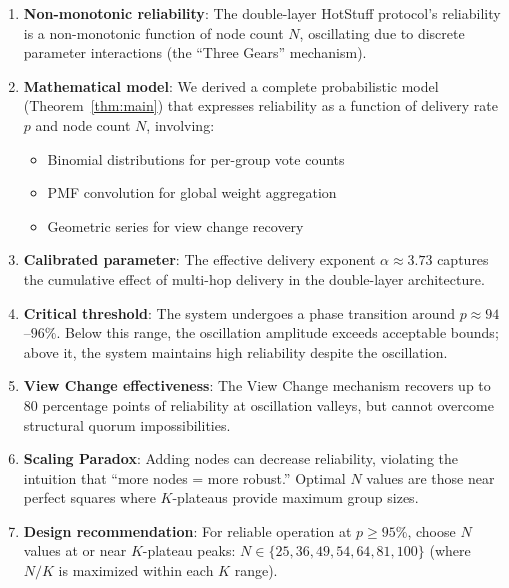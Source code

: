 \documentclass[12pt,a4paper]{article}
\begin{document}
\begin{enumerate}
  \item \textbf{Non-monotonic reliability}: The double-layer HotStuff protocol's reliability is a non-monotonic function of node count $N$, oscillating due to discrete parameter interactions (the ``Three Gears'' mechanism).

  \item \textbf{Mathematical model}: We derived a complete probabilistic model (Theorem~\ref{thm:main}) that expresses reliability as a function of delivery rate $p$ and node count $N$, involving:
  \begin{itemize}
    \item Binomial distributions for per-group vote counts
    \item PMF convolution for global weight aggregation
    \item Geometric series for view change recovery
  \end{itemize}
  
  \item \textbf{Calibrated parameter}: The effective delivery exponent $\alpha \approx 3.73$ captures the cumulative effect of multi-hop delivery in the double-layer architecture.
  
  \item \textbf{Critical threshold}: The system undergoes a phase transition around $p \approx 94$--$96\%$. Below this range, the oscillation amplitude exceeds acceptable bounds; above it, the system maintains high reliability despite the oscillation.
  
  \item \textbf{View Change effectiveness}: The View Change mechanism recovers up to 80 percentage points of reliability at oscillation valleys, but cannot overcome structural quorum impossibilities.
  
  \item \textbf{Scaling Paradox}: Adding nodes can decrease reliability, violating the intuition that ``more nodes = more robust.'' Optimal $N$ values are those near perfect squares where $K$-plateaus provide maximum group sizes.
  
  \item \textbf{Design recommendation}: For reliable operation at $p \geq 95\%$, choose $N$ values at or near $K$-plateau peaks: $N \in \{25, 36, 49, 54, 64, 81, 100\}$ (where $N/K$ is maximized within each $K$ range).
\end{enumerate}

\appendix
\end{document}
